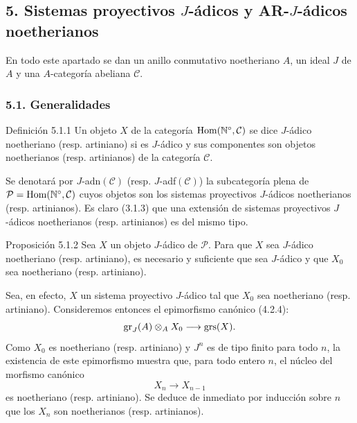 \subsection*{5. Sistemas proyectivos \(J\)-ádicos y AR-\(J\)-ádicos noetherianos}

En todo este apartado se dan un anillo conmutativo noetheriano \(A\), un ideal \(J\) de \(A\) y una \(A\)-categoría abeliana \(\mathcal C\).

\subsubsection*{5.1. Generalidades}

\begin{statement}{Definición 5.1.1}
Un objeto \(X\) de la categoría \(\operatorname{Hom}(\mathbb N^\circ,\mathcal C)\) se dice \(J\)-ádico noetheriano (resp. artiniano) si es \(J\)-ádico y sus componentes son objetos noetherianos (resp. artinianos) de la categoría \(\mathcal C\).
\end{statement}

Se denotará por \(J\)-adn\((\mathcal C)\) (resp. \(J\)-adf\((\mathcal C)\)) la subcategoría plena de
\(\mathcal P=\operatorname{Hom}(\mathbb N^\circ,\mathcal C)\) cuyos objetos son los sistemas proyectivos \(J\)-ádicos noetherianos (resp. artinianos). Es claro (3.1.3) que una extensión de sistemas proyectivos \(J\)-ádicos noetherianos (resp. artinianos) es del mismo tipo.

\begin{statement}{Proposición 5.1.2}
Sea \(X\) un objeto \(J\)-ádico de \(\mathcal P\). Para que \(X\) sea \(J\)-ádico noetheriano (resp. artiniano), es necesario y suficiente que sea \(J\)-ádico y que \(X_0\) sea noetheriano (resp. artiniano).
\end{statement}

\begin{prooftext}
Sea, en efecto, \(X\) un sistema proyectivo \(J\)-ádico tal que \(X_0\) sea noetheriano (resp. artiniano). Consideremos entonces el epimorfismo canónico (4.2.4):
\[
\operatorname{gr}_J(A)\otimes_A X_0\longrightarrow \operatorname{grs}(X).
\]
Como \(X_0\) es noetheriano (resp. artiniano) y \(J^n\) es de tipo finito para todo \(n\), la existencia de este epimorfismo muestra que, para todo entero \(n\), el núcleo del morfismo canónico
\[
X_n\longrightarrow X_{n-1}
\]
es noetheriano (resp. artiniano). Se deduce de inmediato por inducción sobre \(n\) que los \(X_n\) son noetherianos (resp. artinianos).
\end{prooftext}

